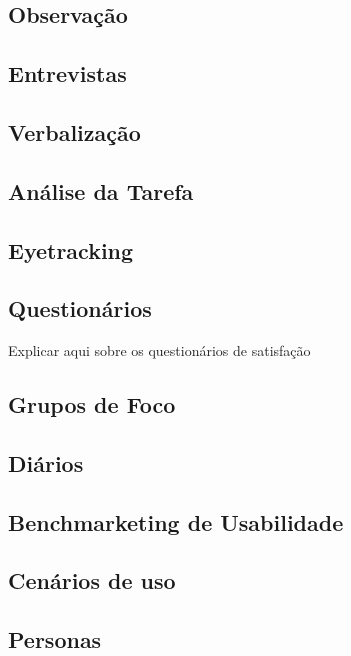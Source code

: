 \subsection{Observação}

\subsection{Entrevistas}

\subsection{Verbalização}

\subsection{Análise da Tarefa}

\subsection{Eyetracking}

\subsection{Questionários}
 Explicar aqui sobre os questionários de satisfação

\subsection{Grupos de Foco}

\subsection{Diários}

\subsection{Benchmarketing de Usabilidade}

\subsection{Cenários de uso}

\subsection{Personas}


